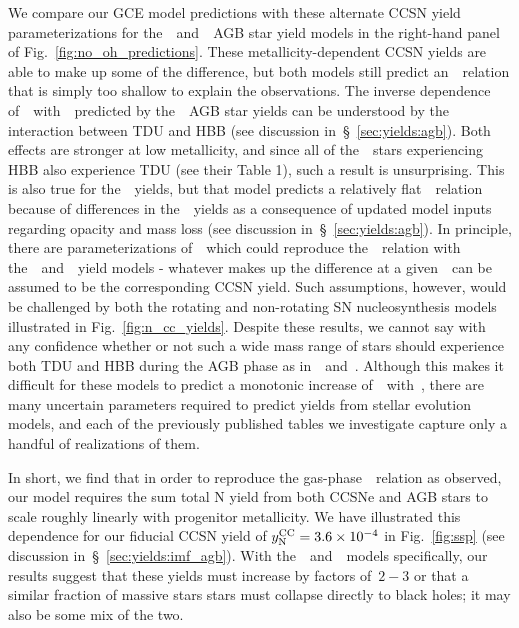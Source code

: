 \documentclass[ms.tex]{subfiles}
\begin{document}
\par
We compare our GCE model predictions with these alternate CCSN yield
parameterizations for the~\karakasten~and~\karakas~AGB star yield models in
the right-hand panel of Fig.~\ref{fig:no_oh_predictions}.
These metallicity-dependent CCSN yields are able to make up some of the
difference, but both models still predict an~\ohno~relation that is simply
too shallow to explain the observations.
The inverse dependence of~\no~with~\oh~predicted by the~\karakasten~AGB star
yields can be understood by the interaction between TDU and HBB (see discussion
in~\S~\ref{sec:yields:agb}).
Both effects are stronger at low metallicity, and since all of
the~\karakasten~stars experiencing HBB also experience TDU (see their Table 1),
such a result is unsurprising.
This is also true for the~\karakas~yields, but that model predicts a relatively
flat~\ohno~relation because of differences in the~\Nfourteen~yields as a
consequence of updated model inputs regarding opacity and mass loss (see
discussion in~\S~\ref{sec:yields:agb}).
In principle, there are parameterizations of~~which could reproduce
the~\ohno~relation with the~\karakasten~and~\karakas~yield models - whatever
makes up the difference at a given~\oh~can be assumed to be the corresponding
CCSN yield.
Such assumptions, however, would be challenged by both the rotating and
non-rotating SN nucleosynthesis models illustrated in
Fig.~\ref{fig:n_cc_yields}.
Despite these results, we cannot say with any confidence whether or not such
a wide mass range of stars should experience both TDU and HBB during the AGB
phase as in~\karakasten~and~\karakas.
Although this makes it difficult for these models to predict a monotonic
increase of~\no~with~\oh, there are many uncertain parameters required to
predict yields from stellar evolution models, and each of the previously
published tables we investigate capture only a handful of realizations of them.
\par
In short, we find that in order to reproduce the gas-phase~\ohno~relation as
observed, our model requires the sum total N yield from both CCSNe and AGB
stars to scale roughly linearly with progenitor metallicity.
We have illustrated this dependence for our fiducial CCSN yield of
$y_\text{N}^\text{CC} = 3.6\times10^{-4}$ in Fig.~\ref{fig:ssp} (see discussion
in~\S~\ref{sec:yields:imf_agb}).
With the~\cristallo~and~\ventura~models specifically, our results suggest that
these yields must increase by factors of~$2 - 3$ or that a similar fraction of
massive stars stars must collapse directly to black holes; it may also be some
mix of the two.
\end{document}
